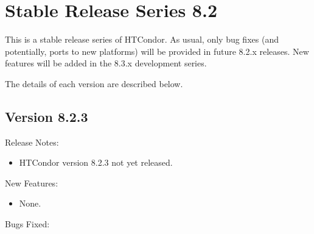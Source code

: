 
\section{\label{sec:History-8-2}Stable Release Series 8.2}

This is a stable release series of HTCondor.
As usual, only bug fixes (and potentially, ports to new platforms)
will be provided in future 8.2.x releases.
New features will be added in the 8.3.x development series.

The details of each version are described below.

\subsection*{\label{sec:New-8-2-3}Version 8.2.3}

\noindent Release Notes:

\begin{itemize}

\item HTCondor version 8.2.3 not yet released.

\end{itemize}


\noindent New Features:

\begin{itemize}

\item None.

\end{itemize}

\noindent Bugs Fixed:

